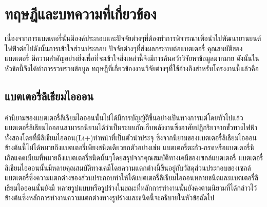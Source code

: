 \chapter{ทฤษฎีและบทความที่เกี่ยวข้อง}
เนื่องจากการแบตเตอรี่นั้นมีองค์ประกอบและปัจจัยต่างๆที่ต้องทำการพิจารณาเพื่อนำไปพัฒนายานยนต์ไฟฟ้าต่อไปดังนั้นการเข้าใจส่วนประกอบ ปัจจัยต่างๆที่ส่งผลกระทบต่อแบตเตอรี่ คุณสมบัติของแบตเตอรี่ มีความสำคัญอย่างยิ่งเพื่อที่จะเข้าใจสิ่งเหล่านี้จึงมีการค้นคว้าวิจัยหาข้อมูลมากมาย ดังนั้นในหัวข้อนี้จึงได้ทำการรวบรวมข้อมูล ทฤษฎีที่เกี่ยวข้องงานวิจัยต่างๆที่ใช้อ้างอิงสำหรับโครงงานนี้แล้วคือ
\section{แบตเตอรี่ลิเธียมไอออน}
คำนิยามของแบตเตอรี่ลิเธียมไอออนนั้นไม่ได้มีการบัญญัติขึ้นอย่างเป็นทางการแต่โดยทั่วไปแล้วแบตเตอรี่ลิเธียมไอออนสามารถนิยามได้ว่าเป็นระบบกักเก็บพลังงานซึ่งอาศัยปฏิกริยาจากขั้วทางไฟฟ้าทั้งสองโดยที่มีลิเธียมไอออน(Li+)ทำหน้าที่เป็นตัวนำประจุ ซึ่งจากนิยามของแบตเตอรี่ลิเธียมไอออนข้างต้นนี้ไม่ได้หมายถึงแบตเตอรี่เพียงชนิดเดียวยกตัวอย่างเช่น แบตเตอรี่ตะกั่ว-กรดหรือแบตเตอรี่นิเกิลแคดเมียมที่หมายถึงแบตเตอรี่ชนิดนั้นๆโดยสรุปจากคุณสมบัติทางเคมีของเซลล์แบตเตอรี่
แบตเตอรี่ลิเธียมไอออนนั้นมีหลายคุณสมบัติทางเคมีโดยความแตกต่างนี้ขึ้นอยู่กับวัสดุส่วนประกอบของเซลล์แบตเตอรี่ซึ่งความแตกต่างของส่วนประกอบทำให้ได้แบตเตอรี่ลิเธียมไอออนหลายชนิดและแบตเตอรี่ลิเธียมไอออนนั้นยังมี
หลายรูปแบบหรือรูปร่างในขณะที่หลักการทำงานนั้นยังคงตามนิยามที่ได้กล่าวไว้ข้างต้นซึ่งหลักการทำงานความแตกต่างทางรูปร่างและชนิดนี้จะอธิบายในหัวข้อถัดไป
